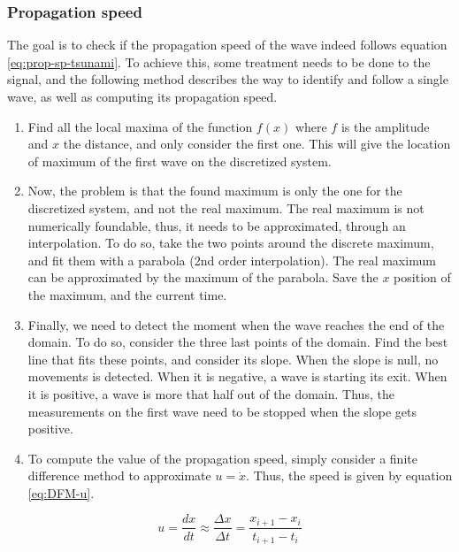 \documentclass[a4paper,12pt,twoside]{article}
\begin{document}
      \subsubsection{Propagation speed}
        The goal is to check if the propagation speed of the wave indeed follows equation \eqref{eq:prop-sp-tsunami}.
        To achieve this, some treatment needs to be done to the signal, and the following method describes the way to identify and follow a single wave, as well as computing its propagation speed.
        \begin{enumerate}
          \item Find all the local maxima of the function $f(x)$ where $f$ is the amplitude and $x$ the distance, and only consider the first one.
          This will give the location of maximum of the first wave on the discretized system.
          \item Now, the problem is that the found maximum is only the one for the discretized system, and not the real maximum.
          The real maximum is not numerically foundable, thus, it needs to be approximated, through an interpolation.
          To do so, take the two points around the discrete maximum, and fit them with a parabola (2nd order interpolation).
          The real maximum can be approximated by the maximum of the parabola.
          Save the $x$ position of the maximum, and the current time.
          \item Finally, we need to detect the moment when the wave reaches the end of the domain.
          To do so, consider the three last points of the domain.
          Find the best line that fits these points, and consider its slope.
          When the slope is null, no movements is detected.
          When it is negative, a wave is starting its exit.
          When it is positive, a wave is more that half out of the domain.
          Thus, the measurements on the first wave need to be stopped when the slope gets positive.
          \item To compute the value of the propagation speed, simply consider a finite difference method to approximate $u=\dot{x}$.
          Thus, the speed is given by equation \eqref{eq:DFM-u}.
        \end{enumerate}

        \begin{equation}
          u=\frac{dx}{dt}\approx\frac{\Delta x}{\Delta t}=\frac{x_{i+1} - x_i}{t_{i+1} - t_i}
          \label{eq:DFM-u}
        \end{equation}
\end{document}
